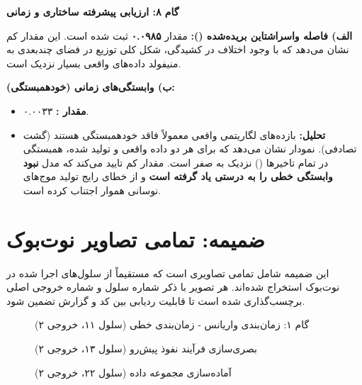 \textbf{گام ۸: ارزیابی پیشرفته ساختاری و زمانی}
\begin{solutionbox}
    \textbf{الف) فاصله واسراشتاین بریده‌شده ():}
    مقدار \textbf{۰.۰۹۸۵} ثبت شده است. این مقدار کم نشان می‌دهد که با وجود اختلاف در کشیدگی، شکل کلی توزیع در فضای چندبعدی به منیفولد داده‌های واقعی بسیار نزدیک است.

    \textbf{ب) وابستگی‌های زمانی (خودهمبستگی):}
    \begin{itemize}
        \item \textbf{مقدار :} ۰.۰۰۳۳.
        \item \textbf{تحلیل:} بازده‌های لگاریتمی واقعی معمولاً فاقد خودهمبستگی هستند (گشت تصادفی). نمودار  نشان می‌دهد که برای هر دو داده واقعی و تولید شده، همبستگی در تمام تاخیرها () نزدیک به صفر است. مقدار کم  تایید می‌کند که مدل \textbf{نبود وابستگی خطی را به درستی یاد گرفته است} و از خطای رایج تولید موج‌های نوسانی هموار اجتناب کرده است.
    \end{itemize}
    
    
\end{solutionbox}


\newpage
\appendix
\section{ضمیمه: تمامی تصاویر نوت‌بوک}

این ضمیمه شامل تمامی تصاویری است که مستقیماً از سلول‌های اجرا شده در نوت‌بوک استخراج شده‌اند. هر تصویر با ذکر شماره سلول و شماره خروجی اصلی برچسب‌گذاری شده است تا قابلیت ردیابی بین کد و گزارش تضمین شود.

\begin{figure}[H]
    \centering
    \caption{گام ۱: زمان‌بندی واریانس - زمان‌بندی خطی (سلول ۱۱، خروجی ۲)}
\end{figure}



\begin{figure}[H]
    \centering
    \caption{بصری‌سازی فرآیند نفوذ پیش‌رو (سلول ۱۳، خروجی ۲)}
\end{figure}



\begin{figure}[H]
    \centering
    \caption{آماده‌سازی مجموعه داده (سلول ۲۲، خروجی ۲)}
\end{figure}

